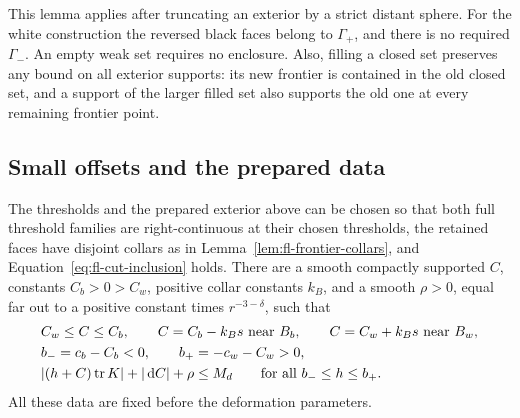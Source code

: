 This lemma applies after truncating an exterior by a strict distant
sphere.  For the white construction the reversed black faces belong to
\(\Gamma_+\), and there is no required \(\Gamma_-\).
An empty weak set requires no enclosure.
Also, filling a closed set preserves any bound on all exterior
supports: its new frontier is contained in the old closed set, and a
support of the larger filled set also supports the old one at every
remaining frontier point.

\subsection{Small offsets and the prepared data}
\label{subsec:fl-offsets}

\begin{lemma}
\label{lem:fl-threshold-preparation}
The thresholds and the prepared exterior above can be chosen so that
both full threshold families are right-continuous at their chosen
thresholds, the retained faces have disjoint collars as in
Lemma~\ref{lem:fl-frontier-collars}, and Equation~\eqref{eq:fl-cut-inclusion}
holds.  There are a smooth compactly supported \(C\), constants
\(C_b>0>C_w\), positive collar constants \(k_B\), and a smooth
\(\rho>0\), equal far out to a positive constant times \(r^{-3-\delta}\),
such that
\begin{align}
\label{eq:fl-offset-shape}
 &C_w\le C\le C_b,\qquad
 C=C_b-k_Bs\ \hbox{near }B_b,\qquad
 C=C_w+k_Bs\ \hbox{near }B_w,\\
\label{eq:fl-face-heights}
 &b_-=c_b-C_b<0,\qquad b_+=-c_w-C_w>0,\\
\label{eq:fl-margin}
 &\lvert(h+C)\operatorname{tr} K\rvert+\lvert\,\mathrm d C\rvert+\rho
       \le M_d\qquad\hbox{for all }b_-\le h\le b_+ .
\end{align}
All these data are fixed before the deformation parameters.
\end{lemma}

